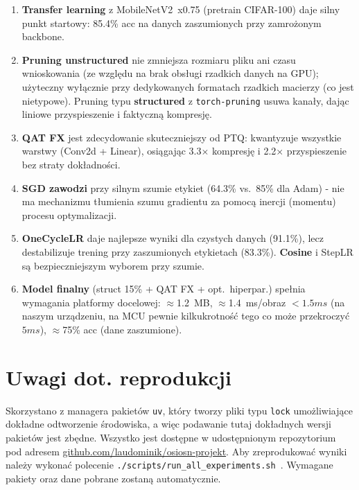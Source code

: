 \documentclass[12pt,twocolumn]{article}
\begin{document}
\begin{enumerate}
  \item \textbf{Transfer learning} z MobileNetV2~x0.75 (pretrain CIFAR-100)
        daje silny punkt startowy: 85.4\% acc na danych zaszumionych przy
        zamrożonym backbone.

  \item \textbf{Pruning unstructured} nie zmniejsza rozmiaru pliku ani
        czasu wnioskowania (ze względu na brak obsługi rzadkich danych na GPU); użyteczny
        wyłącznie przy dedykowanych formatach rzadkich macierzy (co jest nietypowe).
        Pruning typu \textbf{structured} z \texttt{torch-pruning}
        usuwa kanały, dając liniowe przyspieszenie i faktyczną kompresję.

  \item \textbf{QAT FX} jest zdecydowanie skuteczniejszy od PTQ:
        kwantyzuje wszystkie warstwy (Conv2d + Linear), osiągając
        3.3$\times$ kompresję i 2.2$\times$ przyspieszenie bez
        straty dokładności.

  \item \textbf{SGD zawodzi} przy silnym szumie etykiet
        (64.3\% vs.\ 85\% dla Adam) - nie ma mechanizmu tłumienia
        szumu gradientu za pomocą inercji (momentu) procesu optymalizacji.

  \item \textbf{OneCycleLR} daje najlepsze wyniki dla czystych danych
        (91.1\%), lecz destabilizuje trening przy zaszumionych etykietach
        (83.3\%). \textbf{Cosine} i StepLR są bezpieczniejszym wyborem przy szumie.

  \item \textbf{Model finalny} (struct 15\% + QAT FX + opt.\ hiperpar.)
        spełnia wymagania platformy docelowej: $\approx$1.2~MB,
        $\approx$1.4~ms/obraz $< 1.5 ms$ (na naszym urządzeniu, na MCU pewnie kilkukrotność tego co może przekroczyć $5 ms$), $\approx$75\% acc (dane zaszumione).
\end{enumerate}




\section*{Uwagi dot. reprodukcji}

Skorzystano z managera pakietów \texttt{uv}, który tworzy pliki typu \texttt{lock} umożliwiające dokładne odtworzenie środowiska, a więc
podawanie tutaj dokładnych wersji pakietów jest zbędne. Wszystko jest dostępne w udostępnionym repozytorium pod adresem \url{github.com/laudominik/osiosn-projekt}.
Aby zreprodukować wyniki należy wykonać polecenie \texttt{./scripts/run\_all\_experiments.sh
}. Wymagane pakiety oraz dane pobrane zostaną automatycznie.




\end{document}
